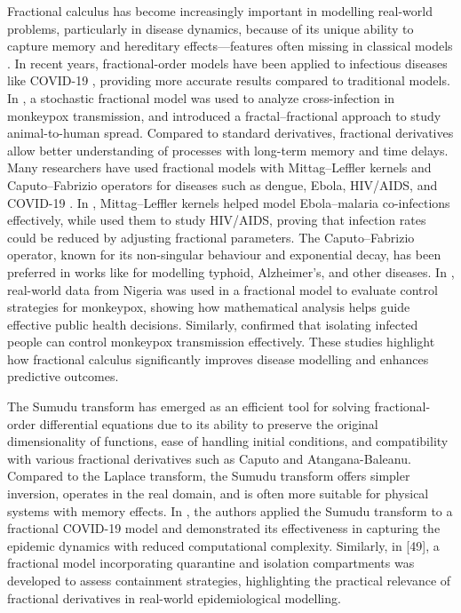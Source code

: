 \documentclass[10pt]{NSP1}
\begin{document}
Fractional calculus has become increasingly important in modelling real-world problems, particularly in disease dynamics, because of its unique ability to capture memory and hereditary effects---features often missing in classical models \cite{ref18,ref19,ref20,ref21,ref22}. In recent years, fractional-order models have been applied to infectious diseases like COVID-19 \cite{ref23,ref24,ref25,ref26,ref27}, providing more accurate results compared to traditional models. In \cite{ref28}, a stochastic fractional model was used to analyze cross-infection in monkeypox transmission, and \cite{ref29} introduced a fractal--fractional approach to study animal-to-human spread. Compared to standard derivatives, fractional derivatives allow better understanding of processes with long-term memory and time delays. Many researchers have used fractional models with Mittag--Leffler kernels and Caputo--Fabrizio operators for diseases such as dengue, Ebola, HIV/AIDS, and COVID-19 \cite{ref30,ref31,ref32,ref33,ref34,ref35,ref36,ref37,ref38,ref39}. In \cite{ref40}, Mittag--Leffler kernels helped model Ebola--malaria co-infections effectively, while \cite{ref41} used them to study HIV/AIDS, proving that infection rates could be reduced by adjusting fractional parameters. The Caputo--Fabrizio operator, known for its non-singular behaviour and exponential decay, has been preferred in works like \cite{ref40,ref41,ref42,ref43,ref44,ref45} for modelling typhoid, Alzheimer's, and other diseases. In \cite{ref46}, real-world data from Nigeria was used in a fractional model to evaluate control strategies for monkeypox, showing how mathematical analysis helps guide effective public health decisions. Similarly, \cite{ref47} confirmed that isolating infected people can control monkeypox transmission effectively. These studies highlight how fractional calculus significantly improves disease modelling and enhances predictive outcomes.

The Sumudu transform has emerged as an efficient tool for solving fractional-order differential equations due to its ability to preserve the original dimensionality of functions, ease of handling initial conditions, and compatibility with various fractional derivatives such as Caputo and Atangana-Baleanu. Compared to the Laplace transform, the Sumudu transform offers simpler inversion, operates in the real domain, and is often more suitable for physical systems with memory effects. In \cite{ref48}, the authors applied the Sumudu transform to a fractional COVID-19 model and demonstrated its effectiveness in capturing the epidemic dynamics with reduced computational complexity. Similarly, in {[}49{]}, a fractional model incorporating quarantine and isolation compartments was developed to assess containment strategies, highlighting the practical relevance of fractional derivatives in real-world epidemiological modelling.
\end{document}
